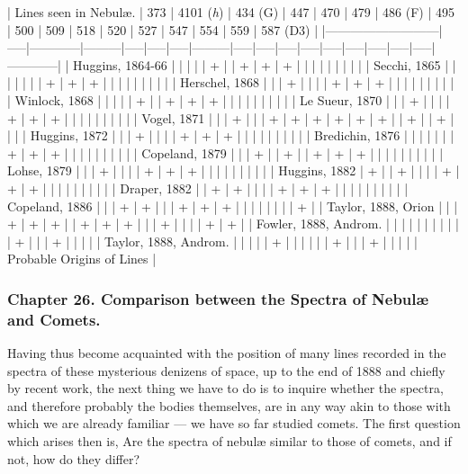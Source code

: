 \documentclass[a4paper, 12pt, oneside, polutonikogreek, english]{article}
\begin{document}
| Lines seen in Nebulæ.   | 373 | 4101 (\emph{h}) | 434 (G) | 447 | 470 | 479 | 486 (F) | 495 | 500 | 509 | 518 | 520 | 527 | 547 | 554 | 559 | 587 (D3)  |
|---------------------------|-----|------------|---------|-----|-----|-----|---------|-----|-----|-----|-----|-----|-----|-----|-----|-----|------------|
| Huggins, 1864-66     |   |      |     |   | +  |   | +    | +  | +  |   |   |   |   |   |   |   |      |
| Secchi, 1865       |   |      |     |   |   |   | +    | +  | +  |   |   |   |   |   |   |   |      |
| Herschel, 1868      |   |      | +    |   |   |   | +    | +  | +  |   |   |   |   |   |   |   |      |
| Winlock, 1868       |   |      |     |   | +  |   | +    | +  | +  |   |   |   |   |   |   |   |      |
| Le Sueur, 1870      |   |      | +    |   |   |   | +    | +  | +  |   |   |   |   |   |   |   |      |
| Vogel, 1871        |   |      | +    |   |   | +  | +    | +  | +  | +  | +  |   | +  |   | +  |   |      |
| Huggins, 1872       |   |      | +    |   |   |   | +    | +  | +  |   |   |   |   |   |   |   |      |
| Bredichin, 1876      |   |      |     |   |   |   | +    | +  | +  |   |   |   |   |   |   |   |      |
| Copeland, 1879      |   |      | +    |   | +  |   | +    | +  | +  |   |   |   |   |   |   |   |      |
| Lohse, 1879        |   |      | +    |   |   |   | +    | +  | +  |   |   |   |   |   |   |   |      |
| Huggins, 1882       | +  |      | +    |   |   |   | +    | +  | +  |   |   |   |   |   |   |   |      |
| Draper, 1882       |   | +     | +    |   |   |   | +    | +  | +  |   |   |   |   |   |   |   |      |
| Copeland, 1886      |   |      | +    | +  |   |   | +    | +  | +  |   |   |   |   |   |   |   | +     |
| Taylor, 1888, Orion    |   |      | +    | +  | +  |   | +    | +  | +  |   |   | +  |   |   |   | +  | +     |
| Fowler, 1888, Androm.   |   |      |     |   |   |   |     |   |   |   | +  |   |   | +  |   |   |      |
| Taylor, 1888, Androm.   |   |      |     |   | +  |   |     |   |   |   | +  |   |   | +  |   |   |      |
| Probable Origins of Lines |

\subsubsection{Chapter 26. Comparison between the Spectra of Nebulæ and Comets.}

Having thus become acquainted with the position of many lines recorded in the spectra of these mysterious denizens of space, up to the end of 1888 and chiefly by recent work, the next thing we have to do is to inquire whether the spectra, and therefore probably the bodies themselves, are in any way akin to those with which we are already familiar --- we have so far studied comets. The first question which arises then is, Are the spectra of nebulæ similar to those of comets, and if not, how do they differ?
\end{document}
